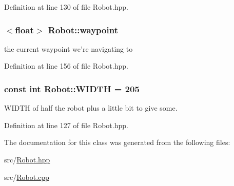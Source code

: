 Definition at line 130 of file Robot.\-hpp.

\hypertarget{classRobot_a4e7ca1c81831d252aa1545f549bff3f4}{
\subsubsection[{waypoint}]{$<$float$>$ Robot\-::waypoint\hspace{0.3cm}{\ttfamily [private]}}}\label{classRobot_a4e7ca1c81831d252aa1545f549bff3f4}


the current waypoint we're navigating to 



Definition at line 156 of file Robot.\-hpp.

\hypertarget{classRobot_aeefc61d76e6ba024e4af9c844715a84d}{
\subsubsection[{W\-I\-D\-T\-H}]{\setlength{\rightskip}{0pt plus 5cm}const int Robot\-::\-W\-I\-D\-T\-H = 205\hspace{0.3cm}{\ttfamily [static]}}}\label{classRobot_aeefc61d76e6ba024e4af9c844715a84d}


W\-I\-D\-T\-H of half the robot plus a little bit to give some. 



Definition at line 127 of file Robot.\-hpp.



The documentation for this class was generated from the following files\-:\begin{DoxyCompactItemize}
\item 
src/\hyperlink{Robot_8hpp}{Robot.\-hpp}\item 
src/\hyperlink{Robot_8cpp}{Robot.\-cpp}\end{DoxyCompactItemize}
